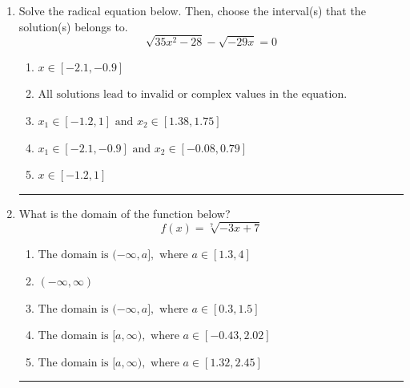 \documentclass[14pt]{extbook}
\newcommand{\litem}[1]{\item#1\hspace*{-1cm}\rule{\textwidth}{0.4pt}}
\begin{document}
\begin{enumerate}
\litem{
Solve the radical equation below. Then, choose the interval(s) that the solution(s) belongs to.\[ \sqrt{35 x^2 - 28} - \sqrt{-29 x} = 0 \]\begin{enumerate}[label=\Alph*.]
\item \( x \in [-2.1,-0.9] \)
\item \( \text{All solutions lead to invalid or complex values in the equation.} \)
\item \( x_1 \in [-1.2, 1] \text{ and } x_2 \in [1.38,1.75] \)
\item \( x_1 \in [-2.1, -0.9] \text{ and } x_2 \in [-0.08,0.79] \)
\item \( x \in [-1.2,1] \)

\end{enumerate} }
\litem{
What is the domain of the function below?\[ f(x) = \sqrt[7]{-3 x + 7} \]\begin{enumerate}[label=\Alph*.]
\item \( \text{The domain is } (-\infty, a], \text{   where } a \in [1.3, 4] \)
\item \( (-\infty, \infty) \)
\item \( \text{The domain is } (-\infty, a], \text{   where } a \in [0.3, 1.5] \)
\item \( \text{The domain is } [a, \infty), \text{   where } a \in [-0.43, 2.02] \)
\item \( \text{The domain is } [a, \infty), \text{   where } a \in [1.32, 2.45] \)


\end{enumerate}}
\end{enumerate}
\end{document}

